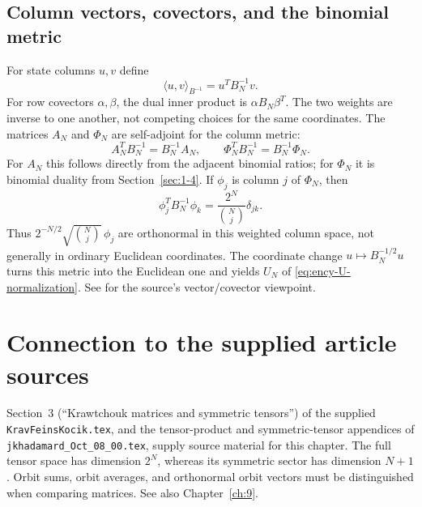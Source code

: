 \subsection{Column vectors, covectors, and the binomial metric}
\label{sec:binomial-dual-metrics}
For state columns $u,v$ define
\[
\langle u,v\rangle_{B^{-1}}=u^TB_N^{-1}v.
\]
For row covectors $\alpha,\beta$, the dual inner product is
$\alpha B_N\beta^T$. The two weights are inverse to one another,
not competing choices for the same coordinates.
The matrices $A_N$ and $\Phi_N$ are self-adjoint for the column metric:
\[
A_N^TB_N^{-1}=B_N^{-1}A_N,\qquad
\Phi_N^TB_N^{-1}=B_N^{-1}\Phi_N.
\]
For $A_N$ this follows directly from the adjacent binomial ratios; for
$\Phi_N$ it is binomial duality from Section~\ref{sec:1-4}.
If $\phi_j$ is column $j$ of $\Phi_N$, then
\[
\phi_j^TB_N^{-1}\phi_k=\frac{2^N}{\binom Nj}\delta_{jk}.
\]
Thus $2^{-N/2}\sqrt{\binom Nj}\,\phi_j$ are orthonormal in this
weighted column space, not generally in ordinary Euclidean coordinates.
The coordinate change $u\mapsto B_N^{-1/2}u$ turns this metric into
the Euclidean one and yields $U_N$ of \eqref{eq:ency-U-normalization}.
See \cite[Appendix~A]{KocikFeynman} for the source's vector/covector viewpoint.

\section*{Connection to the supplied article sources}
Section~3 (``Krawtchouk matrices and symmetric tensors'') of the supplied
\texttt{KravFeinsKocik.tex}, and the tensor-product and symmetric-tensor
appendices of \texttt{jkhadamard\_Oct\_08\_00.tex}, supply source material
for this chapter. The full tensor space has dimension $2^N$, whereas its
symmetric sector has dimension $N+1$. Orbit sums, orbit averages, and
orthonormal orbit vectors must be distinguished when comparing matrices.
See also Chapter~\ref{ch:9}.
